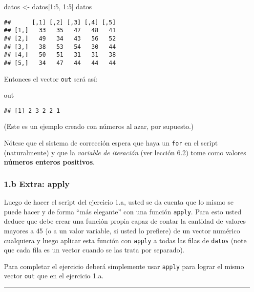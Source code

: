 \documentclass[]{article}
\newenvironment{Shaded}{}{}
\newcommand{\DecValTok}[1]{\textcolor[rgb]{0.25,0.63,0.44}{{#1}}}
\newcommand{\NormalTok}[1]{{#1}}
\begin{document}
\begin{Shaded}
\begin{Highlighting}[]
\NormalTok{datos <- datos[}\DecValTok{1}\NormalTok{:}\DecValTok{5}\NormalTok{, }\DecValTok{1}\NormalTok{:}\DecValTok{5}\NormalTok{]}
\NormalTok{datos}
\end{Highlighting}
\end{Shaded}
\begin{verbatim}
##      [,1] [,2] [,3] [,4] [,5]
## [1,]   33   35   47   48   41
## [2,]   49   34   43   56   52
## [3,]   38   53   54   30   44
## [4,]   50   51   31   31   38
## [5,]   34   47   44   44   44
\end{verbatim}
Entonces el vector \texttt{out} será así:

\begin{Shaded}
\begin{Highlighting}[]
\NormalTok{out}
\end{Highlighting}
\end{Shaded}
\begin{verbatim}
## [1] 2 3 2 2 1
\end{verbatim}
(Este es un ejemplo creado con números al azar, por supuesto.)

Nótese que el sistema de corrección espera que haya un \texttt{for} en
el script (naturalmente) y que la \emph{variable de iteración} (ver
lección 6.2) tome como valores \textbf{números enteros positivos}.

\subsubsection{1.b Extra: apply}

Luego de hacer el script del ejercicio 1.a, usted se da cuenta que lo
mismo se puede hacer y de forma ``más elegante'' con una función
\texttt{apply}. Para esto usted deduce que debe crear una función propia
capaz de contar la cantidad de valores mayores a 45 (o a un valor
variable, si usted lo prefiere) de un vector numérico cualquiera y luego
aplicar esta función con \texttt{apply} a todas las filas de
\texttt{datos} (note que cada fila es un vector cuando se las trata por
separado).

Para completar el ejercicio deberá simplemente usar \texttt{apply} para
lograr el mismo vector \texttt{out} que en el ejercicio 1.a.

\begin{center}\rule{3in}{0.4pt}\end{center}
\end{document}
